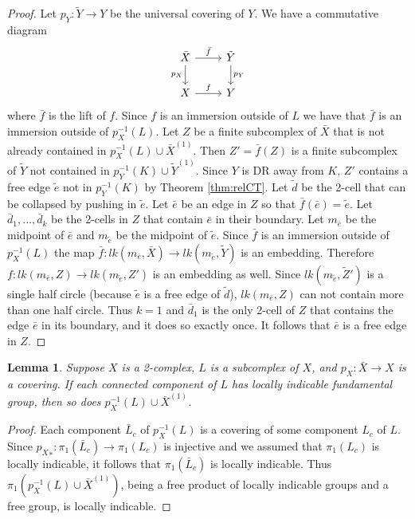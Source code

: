 \documentclass[12pt]{amsart}
\newtheorem{lemma}[thm]{Lemma}
\theoremstyle{definition}
\begin{document}
\begin{proof} Let $p_Y\colon \tilde Y\to Y$ be the universal covering of $Y$. We have a commutative diagram
\[\begin{tikzcd}
\bar X \arrow{r}{\bar f} \arrow[swap]{d}{p_X} & \tilde Y \arrow{d}{p_Y} \\
X \arrow{r}{f} & Y
\end{tikzcd}
\]
where $\bar f$ is the lift of $f$. Since $f$ is an immersion outside of $L$ we have that $\bar f$ is an immersion outside of $p_X^{-1}(L)$. Let $Z$ be a finite subcomplex of $\bar X$ that is not already contained in $p_X^{-1}(L)\cup \bar X^{(1)}$. Then $Z'=\bar f(Z)$ is a finite subcomplex of $\tilde Y$ not contained in $p_Y^{-1}(K)\cup \tilde Y^{(1)}$. Since $Y$ is DR away from $K$, $Z'$ contains a free edge $\tilde e$ not in $p_Y^{-1}(K)$ by Theorem \ref{thm:relCT}. Let $\tilde d$ be the 2-cell that can be collapsed  by pushing in $\tilde e$. 
Let $\bar e$ be an edge in $Z$ so that $\bar f(\bar e)=\tilde e$. Let $\bar d_1,\ldots, \bar d_k$ be the 2-cells in $Z$ that contain $\bar e$ in their boundary. Let $m_{\bar e}$ be the midpoint of $\bar e$ and $m_{\tilde e}$ be the midpoint of $\tilde e$. Since $\bar f$ is an immersion outside of $p_X^{-1}(L)$ the map $\bar f\colon lk(m_{\bar e}, \bar X)\to lk(m_{\tilde e}, \tilde Y)$ is an embedding. Therefore $f\colon lk(m_{\bar e}, Z)\to lk(m_{\tilde e}, Z')$ is an embedding as well. Since $lk(m_{\tilde e}, \tilde Z')$ is a single half circle (because $\tilde e$ is a free edge of $\tilde d$), $lk(m_{\bar e}, Z)$ can not contain more than one half circle. Thus $k=1$ and $\bar d_1$ is the only 2-cell of $Z$ that contains the edge $\bar e$ in its boundary, and it does so exactly once. It follows that $\bar e$ is a free edge in $Z$.
\end{proof}

\begin{lemma}\label{lem:locind} Suppose $X$ is a 2-complex, $L$ is a subcomplex of $X$, and $p_X\colon \bar X\to X$ is a covering. If each connected component of $L$ has locally indicable fundamental group, then so does $p^{-1}_X(L)\cup\bar X^{(1)}$.
\end{lemma}

\begin{proof} 
Each component $\bar L_c$ of $p_X^{-1}(L)$ is a covering of some component $L_c$ of $L$. Since ${p_X}_*\colon \pi_1(\bar L_c)\to \pi_1(L_c)$ is injective and we assumed that $\pi_1(L_c)$ is locally indicable, it follows that $\pi_1(\bar L_c)$ is locally indicable. Thus $\pi_1(p_X^{-1}(L)\cup\bar X^{(1)})$, being a free product of locally indicable groups and a free group, is locally indicable. 
\end{proof}
\end{document}
